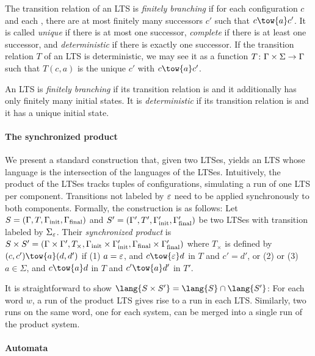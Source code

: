\documentclass[../../diss.tex]{subfiles}
\begin{document}
The transition relation of an LTS is \emph{finitely branching} if for each configuration $c$ and each , there are at most finitely many successors $c'$ such that $c \tow{a} c'$.
It is called \emph{unique} if there is at most one successor, \emph{complete} if there is at least one successor, and \emph{deterministic} if there is exactly one successor.
If the transition relation $T$ of an LTS is deterministic, we may see it as a function $T \colon \Gamma \times \Sigma \to \Gamma$ such that $T(c,a)$ is the unique $c'$ with $c \tow{a} c'$.

An LTS is \emph{finitely branching} if its transition relation is and it additionally has only finitely many initial states.
It is \emph{deterministic} if its transition relation is and it has a unique initial state.

\paragraph{The synchronized product}

We present a standard construction that, given two LTSes, yields an LTS whose language is the intersection of the languages of the LTSes.
Intuitively, the product of the LTSes tracks tuples of configurations, simulating a run of one LTS per component.
Transitions not labeled by $\varepsilon$ need to be applied synchronously to both components.
Formally, the construction is as follows:
Let $S = (\Gamma,T,\Gamma_{\text{init}},\Gamma_{\text{final}})$ and $S' = (\Gamma',T',\Gamma_{\text{init}}',\Gamma_{\text{final}}')$ be two LTSes with transition labeled by $\Sigma_\varepsilon$.
Their \emph{synchronized product} is $S \times S' = (\Gamma \times \Gamma', T_\times, \Gamma_{\text{init}} \times \Gamma_{\text{init}}', \Gamma_{\text{final}} \times \Gamma_{\text{final}}')$ where $T_\times$ is defined by $(c,c') \tow{a} (d,d')$ if
(1) $a = \varepsilon$, and $c \tow{\eps} d$ in $T$ and $c' = d'$,
or
(2) 
or
(3) $a \in \Sigma$, and $c \tow{a} d$ in $T$ and $c' \tow{a} d'$ in $T'$.

It is straightforward to show $\lang{\lts \times \lts'} = \lang{\lts} \cap \lang{\lts'}$: For each word $w$, a run of the product LTS gives rise to a run in each LTS.\@
Similarly, two runs on the same word, one for each system, can be merged into a single run of the product system.


\paragraph{Automata}
\end{document}
